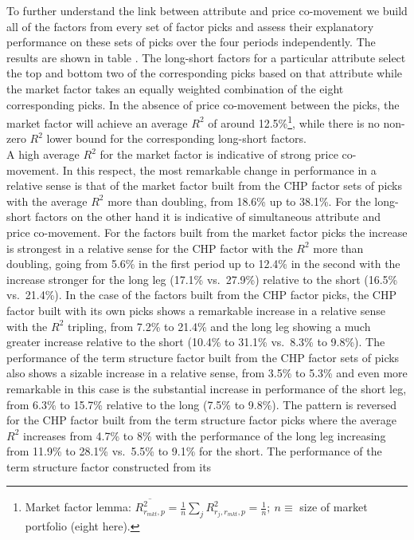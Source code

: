 \documentclass[
  authoryear,
  preprint,
  3p]{elsarticle}
\begin{document}
\medskip

To further understand the link between attribute and price co-movement
we build all of the factors from every set of factor picks and assess
their explanatory performance on these sets of picks over the four
periods independently. The results are shown in table . The long-short
factors for a particular attribute select the top and bottom two of the
corresponding picks based on that attribute while the market factor
takes an equally weighted combination of the eight corresponding picks.
In the absence of price co-movement between the picks, the market factor
will achieve an average \(R^{2}\) of around 12.5\%\footnote{Market
  factor lemma:
  \(\overline{R_{r_{mkt}, p}^{2}} = \frac{1}{n} \sum_{j} R_{r_{j}, r_{mkt}, p}^{2} = \frac{1}{n}; \: n\equiv\)
  size of market portfolio (eight here).}, while there is no non-zero
\(R^{2}\) lower bound for the corresponding long-short factors.\\
A high average \(R^{2}\) for the market factor is indicative of strong
price co-movement. In this respect, the most remarkable change in
performance in a relative sense is that of the market factor built from
the CHP factor sets of picks with the average \(R^{2}\) more than
doubling, from 18.6\% up to 38.1\%. For the long-short factors on the
other hand it is indicative of simultaneous attribute and price
co-movement. For the factors built from the market factor picks the
increase is strongest in a relative sense for the CHP factor with the
\(R^{2}\) more than doubling, going from 5.6\% in the first period up to
12.4\% in the second with the increase stronger for the long leg (17.1\%
vs.~27.9\%) relative to the short (16.5\% vs.~21.4\%). In the case of
the factors built from the CHP factor picks, the CHP factor built with
its own picks shows a remarkable increase in a relative sense with the
\(R^{2}\) tripling, from 7.2\% to 21.4\% and the long leg showing a much
greater increase relative to the short (10.4\% to 31.1\% vs.~8.3\% to
9.8\%). The performance of the term structure factor built from the CHP
factor sets of picks also shows a sizable increase in a relative sense,
from 3.5\% to 5.3\% and even more remarkable in this case is the
substantial increase in performance of the short leg, from 6.3\% to
15.7\% relative to the long (7.5\% to 9.8\%). The pattern is reversed
for the CHP factor built from the term structure factor picks where the
average \(R^{2}\) increases from 4.7\% to 8\% with the performance of
the long leg increasing from 11.9\% to 28.1\% vs.~5.5\% to 9.1\% for the
short. The performance of the term structure factor constructed from its
\end{document}
